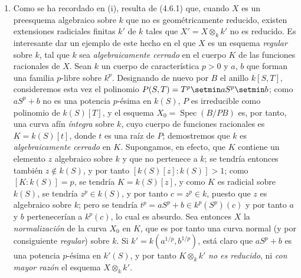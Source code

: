 \begin{remarks}[6.7.5]
\begin{enumerate}
\item[(ii)] Como se ha recordado en (i), resulta de (4.6.1) que,
cuando $X$ es un preesquema algebraico sobre $k$ que no es
geométricamente reducido, existen extensiones radiciales finitas $k'$ de
$k$ tales que $X'=X\otimes_k k'$ no es reducido. Es interesante
dar un ejemplo de este hecho en el que $X$ es un esquema \emph{regular} sobre $k$, tal
que $k$ sea \emph{algebraicamente cerrado} en el cuerpo $K$ de las funciones
racionales de $X$. Sean $k$ un cuerpo de característica $p>0$ y $a$, $b$ que forman una familia $p$-libre sobre $k^p$. Designando de nuevo por $B$ el anillo $k[S,T]$, consideremos esta vez
el polinomio $P(S,T)=T^p\setmin aS^p\setmin b$; como $aS^p+b$ no es una potencia
$p$-ésima en $k(S)$, $P$ es irreducible como polinomio de $k(S)[T]$,
y el esquema $X_0=\operatorname{Spec}(B/PB)$ es, por tanto, una curva afín
\emph{íntegra} sobre $k$, cuyo cuerpo de funciones racionales es
$K=k(S)[t]$, donde $t$ es una raíz de $P$; demostremos que $k$ es
\emph{algebraicamente cerrado} en $K$. Supongamos, en efecto, que $K$ contiene un
elemento $z$ algebraico sobre $k$ y que no pertenece a $k$; se tendría entonces también
$z\notin k(S)$, y por tanto $[k(S)[z]:k(S)]>1$; como $[K:k(S)]=p$, se tendría $K=k(S)[z]$, y como $K$ es radicial sobre $k(S)$, se tendría
$z^p\in k(S)$, y por tanto $c=z^p\in k$, puesto que $z$ es algebraico sobre $k$;
pero se tendría $t^p=aS^p+b\in k^p(S^p)(c)$ y por tanto $a$ y $b$
pertenecerían a $k^p(c)$, lo cual es absurdo. Sea entonces $X$ la
\emph{normalización} de la curva $X_0$ en $K$, que es por tanto una curva normal
(y por consiguiente \emph{regular}) sobre $k$. Si $k'=k(a^{1/p},b^{1/p})$, está
claro que $aS^p+b$ es una potencia $p$-ésima en $k'(S)$, y por tanto
$K\otimes_k k'$ \emph{no es reducido}, ni \emph{con mayor razón} el esquema
$X\otimes_k k'$.
\end{enumerate}
\end{remarks}
